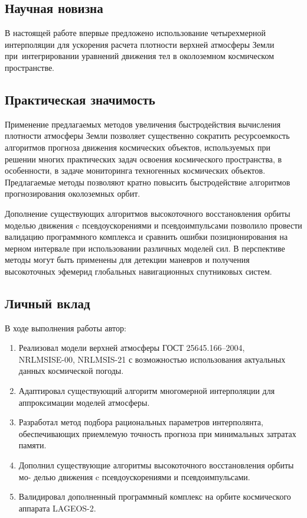 \subsection*{Научная новизна}

В настоящей работе впервые предложено использование четырехмерной интерполяции для
ускорения расчета плотности верхней атмосферы Земли 
при интегрировании уравнений движения тел в околоземном космическом пространстве.

\subsection*{Практическая значимость}

Применение предлагаемых методов увеличения быстродействия вычисления плотности атмосферы 
Земли позволяет существенно сократить ресурсоемкость алгоритмов 
прогноза движения космических объектов, используемых при решении 
многих практических задач освоения космического пространства, в особенности, в задаче 
мониторинга техногенных космических объектов. Предлагаемые методы позволяют кратно
повысить быстродействие алгоритмов прогнозирования околоземных орбит.

Дополнение существующих алгоритмов высокоточного восстановления орбиты моделью 
движения c псевдоускорениями и псевдоимпульсами позволило провести валидацию
программного комплекса и сравнить ошибки позиционирования на мерном интервале при
использовании различных моделей сил. В перспективе методы могут быть применены для детекции маневров и
получения высокоточных эфемерид глобальных навигационных спутниковых систем.

\subsection*{Личный вклад}

В ходе выполнения работы автор:
\begin{enumerate}
    \item Реализовал модели верхней атмосферы ГОСТ 25645.166–2004, \\
    NRLMSISE-00, NRLMSIS-21
    с возможностью использования актуальных данных космической погоды.
    \item Адаптировал существующий алгоритм многомерной интерполяции для
    аппроксимации моделей атмосферы.
    \item Разработал метод подбора рациональных параметров интерполянта,
    обеспечивающих приемлемую точность прогноза при минимальных затратах памяти.
    \item Дополнил существующие алгоритмы высокоточного восстановления орбиты мо-
    делью движения c псевдоускорениями и псевдоимпульсами.
    \item Валидировал дополненный программный комплекс на орбите космического аппарата LAGEOS-2.
\end{enumerate}


\newpage
